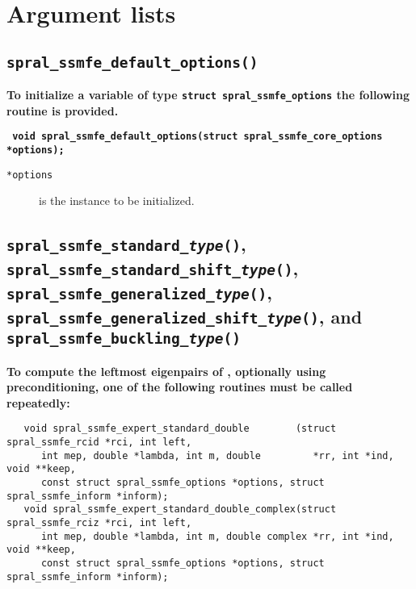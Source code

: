 \section{Argument lists}

\subsection{\texttt{spral\_ssmfe\_default\_options()}}

\textbf{To initialize a variable of type \texttt{struct spral\_ssmfe\_options}
the following routine is provided.}

\medskip
\noindent
\textbf{\texttt{
      \hspace*{0.3cm} void spral\_ssmfe\_default\_options(struct spral\_ssmfe\_core\_options *options);
}}

\noindent
\begin{description}
   \item[\texttt{*options}] is the instance to be initialized.
\end{description}

\subsection{%
   \texttt{spral\_ssmfe\_standard\_\textit{type}()},
   \texttt{spral\_ssmfe\_standard\_shift\_\textit{type}()},\\
   \texttt{spral\_ssmfe\_generalized\_\textit{type}()},
   \texttt{spral\_ssmfe\_generalized\_shift\_\textit{type}()}, and
   \texttt{spral\_ssmfe\_buckling\_\textit{type}()}
}
\label{ssmfe_expert:routine:solver}

{\bf
To compute
the leftmost eigenpairs of ,
optionally using preconditioning,
one of the following routines must be called repeatedly:
}
\begin{verbatim}
   void spral_ssmfe_expert_standard_double        (struct spral_ssmfe_rcid *rci, int left,
      int mep, double *lambda, int m, double         *rr, int *ind, void **keep,
      const struct spral_ssmfe_options *options, struct spral_ssmfe_inform *inform);
   void spral_ssmfe_expert_standard_double_complex(struct spral_ssmfe_rciz *rci, int left,
      int mep, double *lambda, int m, double complex *rr, int *ind, void **keep,
      const struct spral_ssmfe_options *options, struct spral_ssmfe_inform *inform);   
\end{verbatim}


